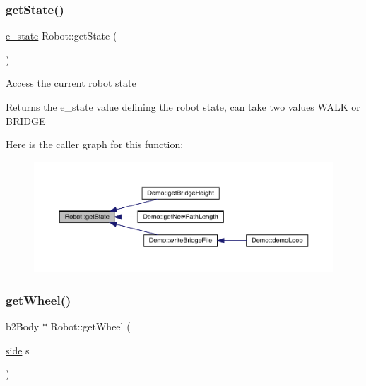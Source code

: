 \subsubsection{\texorpdfstring{get\+State()}{getState()}}
{\footnotesize\ttfamily \mbox{\hyperlink{_robot_8h_a74a75e4700f1f71bb89d80765319e57b}{e\+\_\+state}} Robot\+::get\+State (\begin{DoxyParamCaption}{ }\end{DoxyParamCaption})}

Access the current robot state \begin{DoxyReturn}{Returns}
the e\+\_\+state value defining the robot state, can take two values W\+A\+LK or B\+R\+I\+D\+GE 
\end{DoxyReturn}
Here is the caller graph for this function\+:\nopagebreak
\begin{figure}[H]
\begin{center}
\leavevmode
\includegraphics[width=350pt]{class_robot_a65b9be1d9d45b004a6ea500dd5f85246_icgraph}
\end{center}
\end{figure}
\mbox{\label{class_robot_a7c5ede93bcb2007be1f2bd6b2137f271}} 
\subsubsection{\texorpdfstring{get\+Wheel()}{getWheel()}}
{\footnotesize\ttfamily b2\+Body $\ast$ Robot\+::get\+Wheel (\begin{DoxyParamCaption}\item[{\mbox{\hyperlink{_robot_8h_afc015eff6557e84151d2e53b94375445}{side}}}]{s }\end{DoxyParamCaption})}

